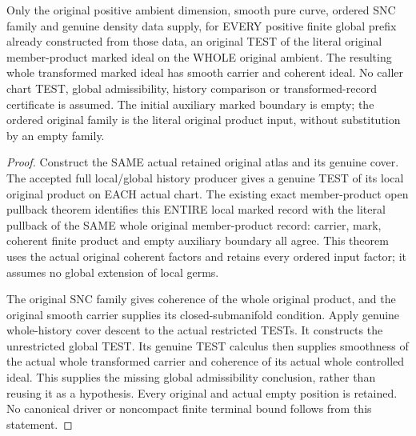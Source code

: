 \begin{theorem}
\label{hir:sharp-actual-curve-original-global-prefix-test}
\leanok
Only the original positive ambient dimension, smooth pure curve, ordered
SNC family and genuine density data supply, for EVERY positive finite
global prefix already constructed from those data, an original TEST of
the literal original member-product marked ideal on the WHOLE original
ambient. The resulting whole transformed marked ideal has smooth carrier
and coherent ideal. No caller chart TEST, global admissibility, history
comparison or transformed-record certificate is assumed. The initial
auxiliary marked boundary is empty; the ordered original family is the
literal original product input, without substitution by an empty family.
\end{theorem}
\begin{proof}
Construct the SAME actual retained original atlas and its genuine cover.
The accepted full local/global history producer gives a genuine TEST of
its local original product on EACH actual chart. The existing exact
member-product open pullback theorem identifies this ENTIRE local marked
record with the literal pullback of the SAME whole original member-product
record: carrier, mark, coherent finite product and empty auxiliary boundary
all agree. This theorem uses the actual original coherent factors and
retains every ordered input factor; it assumes no global extension of
local germs.

The original SNC family gives coherence of the whole original product,
and the original smooth carrier supplies its closed-submanifold condition.
Apply genuine whole-history cover descent to the actual restricted TESTs.
It constructs the unrestricted global TEST. Its genuine TEST calculus then
supplies smoothness of the actual whole transformed carrier and coherence
of its actual whole controlled ideal. This supplies the missing global
admissibility conclusion, rather than reusing it as a hypothesis. Every
original and actual empty position is retained. No canonical driver or
noncompact finite terminal bound follows from this statement.
\end{proof}

